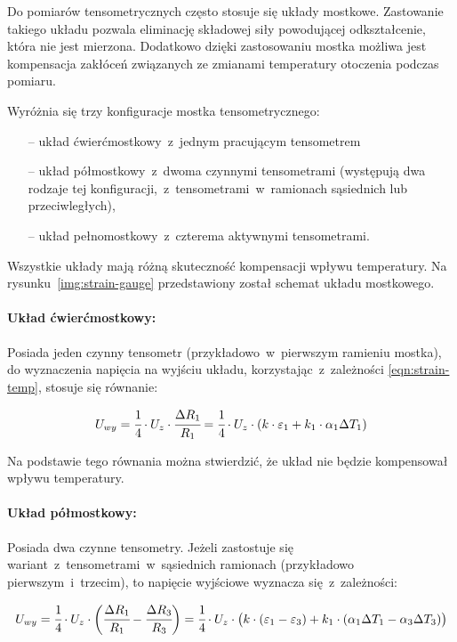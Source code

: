 Do pomiarów tensometrycznych często stosuje się układy mostkowe. Zastowanie takiego układu pozwala
eliminację składowej siły powodującej odkształcenie, która nie jest mierzona. Dodatkowo dzięki
zastosowaniu mostka możliwa jest kompensacja zakłóceń związanych ze zmianami temperatury otoczenia
podczas pomiaru.

Wyróżnia się trzy konfiguracje mostka tensometrycznego:
\begin{itemize}
  \item [--] układ ćwierćmostkowy~z~jednym pracującym tensometrem
  \item [--] układ półmostkowy~z~dwoma czynnymi tensometrami (występują dwa rodzaje tej
        konfiguracji,~z~tensometrami~w~ramionach sąsiednich lub przeciwległych),
  \item [--] układ pełnomostkowy~z~czterema aktywnymi tensometrami.
\end{itemize}
Wszystkie układy mają różną skuteczność kompensacji wpływu temperatury. Na
rysunku~\ref{img:strain-gauge} przedstawiony został schemat układu mostkowego.


\paragraph{Układ ćwierćmostkowy:} Posiada jeden czynny tensometr (przykładowo~w~pierwszym ramieniu
mostka), do wyznaczenia napięcia na wyjściu układu, korzystając~z~zależności \ref{eqn:strain-temp},
stosuje się równanie:

\begin{equation}
  U_{wy}=\cfrac{1}{4}\cdot{U_z}\cdot\cfrac{\Delta R_1}{R_1}=\cfrac{1}{4}\cdot{U_z}\cdot({k}
  \cdot\varepsilon_1+{k_1}\cdot\alpha_1\Delta{T_1})
\end{equation}

Na podstawie tego równania można stwierdzić, że układ nie będzie kompensował wpływu temperatury.

\paragraph{Układ półmostkowy:} Posiada dwa czynne tensometry. Jeżeli zastostuje się
wariant~z~tensometrami~w~sąsiednich ramionach (przykładowo pierwszym~i~trzecim), to napięcie
wyjściowe wyznacza się~z~zależności:

\begin{equation}\label{eqn:half-bridge-adj}
  U_{wy}=\cfrac{1}{4}\cdot{U_z}\cdot\bigg(\cfrac{\Delta R_1}{R_1}-\cfrac{\Delta R_3}{R_3}\bigg)=
  \cfrac{1}{4}\cdot{U_z}\cdot\big({k}\cdot(\varepsilon_1-\varepsilon_3)+{k_1}\cdot(\alpha_1
  \Delta{T_1}-\alpha_3\Delta{T_3})\big)
\end{equation}

